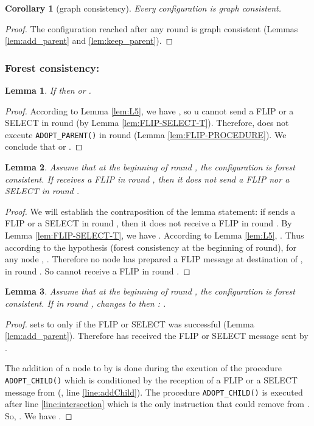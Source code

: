 \documentclass[twocolumn]{article}
\newtheorem{lemma}{Lemma}
\newtheorem{corollary}{Corollary}
\newcommand{\depends}[1]{}
\begin{document}
\begin{corollary}[graph consistency]
\label{co:consistency}
Every configuration is graph consistent.
\end{corollary}
\begin{proof}
The configuration reached after any round is graph consistent
(Lemmas \ref{lem:add_parent} and \ref{lem:keep_parent}).
 \end{proof}

\subsubsection{Forest consistency:}


\begin{lemma}
\label{lem:N-parent}
If  then  or .
\depends{ }
\end{lemma}

\begin{proof}
According to Lemma \ref{lem:L5}, we have , so 
u cannot send a  FLIP or a SELECT in round  (by Lemma \ref{lem:FLIP-SELECT-T}).
Therefore,  does not execute \texttt{ADOPT\_PARENT()} in round  
(Lemma \ref{lem:FLIP-PROCEDURE}). We conclude that 
 or .
 \end{proof}




\begin{lemma}
\label{lem:cond-2FLIPs}
Assume that at the beginning of round , the configuration is forest consistent. If  receives a FLIP in round , then it does not send a FLIP nor a SELECT in round .
\depends{\ref{th:consistency},  \ref{lem:FLIP-SELECT-T}, \ref{lem:L5}}
\end{lemma}


\begin{proof}
We will establish the contraposition of the lemma statement: 
if  sends a FLIP or a SELECT in round , then it does not receive a FLIP in round .
By Lemma \ref{lem:FLIP-SELECT-T}, we have .
According to Lemma \ref{lem:L5}, .
Thus according to the hypothesis (forest consistency at the beginning of round), for any node , .
Therefore no node has prepared a FLIP message at destination of , 
in round .
So  cannot receive a FLIP in round .
 \end{proof}


\begin{lemma}
 \label{lem:add_parent_add_child}
Assume that at the beginning of round , the configuration is forest consistent. If in round ,  changes  to  then 
 : 
.
\end{lemma}
\begin{proof}
 sets  to  only if the FLIP or SELECT was successful 
(Lemma \ref{lem:add_parent}). 
Therefore  has received the FLIP or SELECT message sent by .
 
The addition of a node  to  by  is done during
the excution of the procedure \texttt{ADOPT\_CHILD()} which is 
conditioned by the reception of a FLIP or a SELECT message  from   
(, line \ref{line:addChild}). 
The procedure \texttt{ADOPT\_CHILD()} is executed after line \ref{line:intersection}
which is the only instruction that could remove  from . 
So, . 
We have .
 \end{proof}
\end{document}
